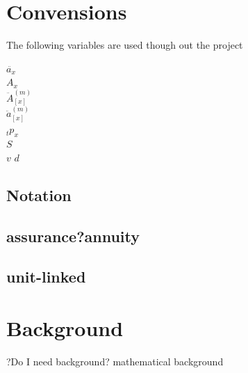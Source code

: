 \documentclass{report}
\begin{document}
\chapter*{Convensions}

The following variables are used though out the project

$\ddot{a_x}$\\
$A_x$\\
$\ddot{A}^{(m)}_{[x]}$\\
$\ddot{a}^{(m)}_{[x]}$\\
$_t p_x$\\
$S$\\
$v$
$d$

\section*{Notation}
















\section*{assurance?annuity}

\section*{unit-linked}











\chapter*{Background}



?Do I need background? mathematical background
\end{document}
